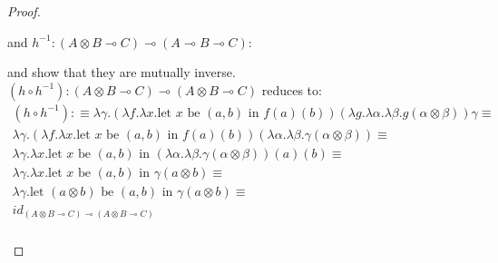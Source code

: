 \begin{thm}
\begin{proof}
\begin{enumerate}
\begin{prooftree}
        \end{prooftree}
and $h^{-1} : (A \otimes B \multimap C) \multimap (A \multimap B \multimap C)$:
        \begin{prooftree}
        \end{prooftree}
        and show that they are mutually inverse.
        $(h \circ h^{-1}) : (A \otimes B \multimap C) \multimap (A \otimes B \multimap C)$ reduces to:
        \[
          \begin{split}
            (h \circ h^{-1}) : \equiv \lambda \gamma. (\lambda f. \lambda x . \text{let $x$ be $(a, b)$ in $f(a)(b)$})( \lambda g. \lambda \alpha. \lambda \beta. g(\alpha \otimes \beta)) \gamma \equiv\\
            \lambda \gamma. (\lambda f. \lambda x . \text{let $x$ be $(a, b)$ in $f(a)(b)$}) (\lambda \alpha. \lambda \beta. \gamma(\alpha \otimes \beta)) \equiv \\
            \lambda \gamma. \lambda x . \text{let $x$ be $(a, b)$ in $(\lambda \alpha. \lambda \beta. \gamma(\alpha \otimes \beta))(a)(b)$}  \equiv \\
            \lambda \gamma. \lambda x . \text{let $x$ be $(a, b)$ in $\gamma(a \otimes b)$}  \equiv \\
            \lambda \gamma. \text{let $(a \otimes b)$ be $(a, b)$ in $\gamma(a \otimes b)$}  \equiv \\
            id_{(A \otimes B \multimap C) \multimap (A \otimes B \multimap C)}\\

\end{split}\]
\end{enumerate}
\end{proof}
\end{thm}
